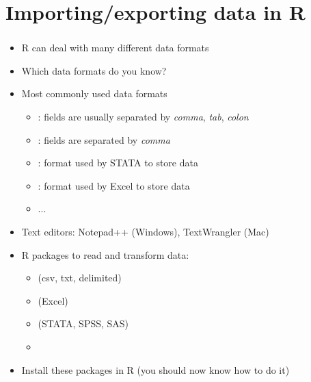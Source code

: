 \documentclass[8pt]{beamer}
\begin{document}

\section{Importing/exporting data in R}


\bgroup
{}
\begin{frame}[plain]{}
\begin{center}
\color{white}{\Huge\insertsection}
\end{center}
\end{frame}
\egroup


\begin{frame}
\frametitle{\insertsection}

\begin{itemize}[<+->]
\item R can deal with many different data formats
\item Which data formats do you know?
\item Most commonly used data formats
    \begin{itemize}
    \item {\color{blue}{txt}}: fields are usually separated by \textit{comma}, \textit{tab}, \textit{colon}
    \item {\color{blue}{csv}}: fields are separated by \textit{comma}
    \item {\color{blue}{dta}}: format used by STATA to store data
    \item {\color{blue}{xls/xlsx}}: format used by Excel to store data
    \item ...
    \end{itemize}
\item Text editors: Notepad++ (Windows), TextWrangler (Mac)
\item R packages to read and transform data:
    \begin{itemize}
    \item {\color{blue}{``readr''}} (csv, txt, delimited)
    \item {\color{blue}{``readxl''}} (Excel)
    \item {\color{blue}{``haven''}} (STATA, SPSS, SAS)
    \item {\color{blue}{``tidyverse''}}
    \end{itemize}
\item Install these packages in R (you should now know how to do it)
\end{itemize}

\end{frame}
\end{document}
